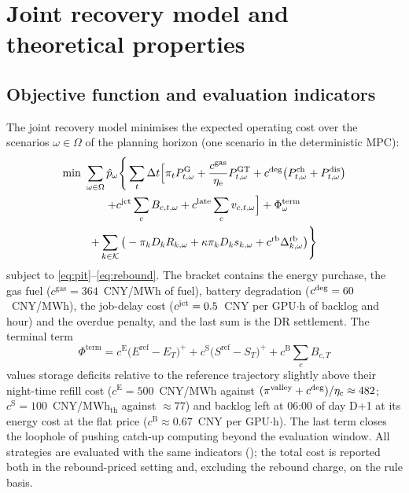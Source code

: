 \section{Joint recovery model and theoretical properties}
\label{sec:model}

\subsection{Objective function and evaluation indicators}
\label{sec:objective}

The joint recovery model minimises the expected operating cost over the scenarios $\omega\in\Omega$ of the planning
horizon (one scenario in the deterministic MPC):
\begin{multline}
\min\ \sum_{\omega\in\Omega}\hat p_\omega\Bigg\{\sum_{t}\Delta t\Big[\pi_tP^{\mathrm{G}}_{t,\omega}+\frac{c^{\mathrm{gas}}}{\eta_{\mathrm{e}}}P^{\mathrm{GT}}_{t,\omega}
+c^{\mathrm{deg}}\big(P^{\mathrm{ch}}_{t,\omega}+P^{\mathrm{dis}}_{t,\omega}\big)\\
+c^{\mathrm{jct}}\sum_cB_{c,t,\omega}+c^{\mathrm{late}}\sum_cv_{c,t,\omega}\Big]
+\Phi^{\mathrm{term}}_{\omega}\\
+\sum_{k\in\mathcal{K}}\big(-\pi_kD_kR_{k,\omega}+\kappa\pi_kD_ks_{k,\omega}+c^{\mathrm{rb}}\Delta^{\mathrm{rb}}_{k,\omega}\big)\Bigg\}
\label{eq:obj}
\end{multline}
subject to \eqref{eq:pit}--\eqref{eq:rebound}. The bracket contains the energy purchase, the gas fuel
($c^{\mathrm{gas}}=364$~CNY/MWh of fuel), battery degradation ($c^{\mathrm{deg}}=60$~CNY/MWh), the job-delay cost
($c^{\mathrm{jct}}=0.5$~CNY per GPU$\cdot$h of backlog and hour) and the overdue penalty, and the last sum is the DR settlement. The
terminal term
\begin{equation}
\Phi^{\mathrm{term}}=c^{\mathrm{E}}\big(E^{\mathrm{ref}}-E_T\big)^+\!+c^{\mathrm{S}}\big(S^{\mathrm{ref}}-S_T\big)^+\!+c^{\mathrm{B}}\sum_cB_{c,T}
\label{eq:term}
\end{equation}
values storage deficits relative to the reference trajectory slightly above their night-time refill cost
($c^{\mathrm{E}}=500$~CNY/MWh against $(\pi^{\mathrm{valley}}+c^{\mathrm{deg}})/\eta_{\mathrm{c}}\approx482$;
$c^{\mathrm{S}}=100$~CNY/MWh$_{\mathrm{th}}$ against $\approx77$) and backlog left at 06:00 of day D+1 at its energy
cost at the flat price ($c^{\mathrm{B}}\approx0.67$~CNY per GPU$\cdot$h). The last term closes the loophole of pushing
catch-up computing beyond the evaluation window. All strategies are evaluated with the same indicators
(); the total cost is reported both in the rebound-priced setting and, excluding the rebound charge,
on the rule basis.

